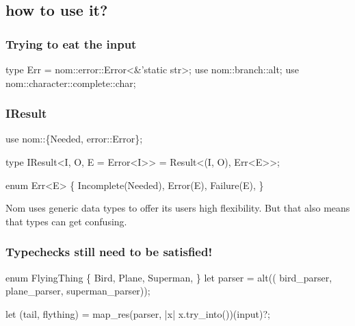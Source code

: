 \documentclass[a4paper]{beamer}
\begin{document}
\subsection{how to use it?}

\begin{frame}[fragile]\frametitle{Trying to eat the input}
\begin{semiverbatim}
type Err = nom::error::Error<&'static str>;
use nom::branch::alt;
use nom::character::complete::char;
\end{semiverbatim}
\end{frame}

\begin{frame}[fragile]\frametitle{IResult}
\begin{semiverbatim}
use nom::\{Needed, error::Error\};

type IResult<I, O, E = Error<I>> = Result<(I, O), Err<E>>;

enum Err<E> \{
  Incomplete(Needed),
  Error(E),
  Failure(E),
\}
\end{semiverbatim}

Nom uses generic data types to offer its users high flexibility.
But that also means that types can get confusing.
\end{frame}

\begin{frame}[fragile]\frametitle{Typechecks still need to be satisfied!}
\begin{semiverbatim}
enum FlyingThing \{
    Bird,
    Plane,
    Superman,
\}
let parser = alt((
    bird_parser,
    plane_parser,
    superman_parser));

let (tail, flything) = map_res(parser,
                               |x| x.try_into())(input)?;
\end{semiverbatim}
\end{frame}
\end{document}
